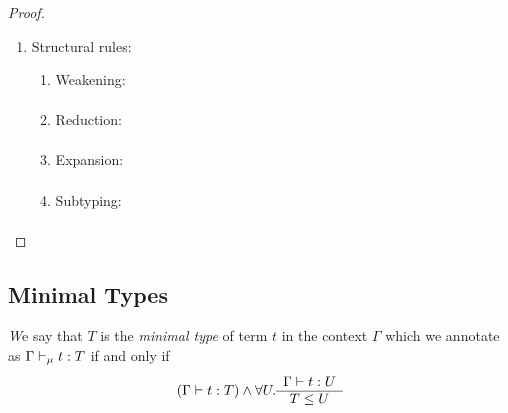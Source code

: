 \begin{lemma}
\begin{proof}
{\begin{enumerate}
\begin{enumerate}
                {\bf This proof might fail here.} There seems to be no
                possibility to prove $x \notin B$ and therefore it is
                questionable, if the induction hypotheses can be used. Without
                the induction hypotheses there seems to be no way to proof the
                desired result!!!


                INCOMPLETE!! POSSIBLY IMPOSSIBLE!!!

            \end{enumerate}
            \item Structural rules:
            \begin{enumerate}
                \item Weakening:
                $$
                \begin{array}{l|l}
                \end{array}
                $$

                \item Reduction:
                $$
                \begin{array}{l|l}
                \end{array}
                $$

                \item Expansion:
                $$
                \begin{array}{l|l}
                \end{array}
                $$

                \item Subtyping:
                $$
                \begin{array}{l|l}
                \end{array}
                $$

            \end{enumerate}
        \end{enumerate}
        }
    \end{proof}
\end{lemma}




\subsection{Minimal Types}

\begin{definition}
    \emph We say that $T$ is the \emph{minimal type} of term $t$ in the
    context $\Gamma$ which we annotate as $\Gamma \vdash_\mu t: T$ if and only
    if
    $$
    (\Gamma \vdash t: T)
    \land
    \forall U. \begin{array}{c} \Gamma \vdash t: U \\ \hline T \le U\end{array}
    $$
\end{definition}


